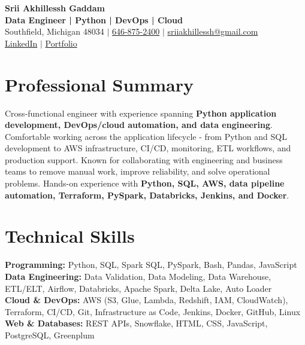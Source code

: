 \documentclass[letterpaper,10pt]{article}
\begin{document}
\fontsize{9.35pt}{10.45pt}\selectfont

\begin{center}
    {\LARGE \textbf{Srii Akhillessh Gaddam}} \\[-1pt]
    \textbf{Data Engineer | Python | DevOps | Cloud} \\[2pt]
    Southfield, Michigan 48034 $|$
    \href{tel:6468752400}{646-875-2400} $|$
    \href{mailto:sriiakhillessh@gmail.com}{sriiakhillessh@gmail.com} \\[1pt]
    \href{https://www.linkedin.com/in/srii-akhiilessh-gaddam-b48668191/}{LinkedIn} $|$
    \href{https://sriiakhillesshg.github.io/portfolio/}{Portfolio}
\end{center}
\vspace{-8pt}

\section{Professional Summary}
\small{Cross-functional engineer with experience spanning \textbf{Python application development, DevOps/cloud automation, and data engineering}. Comfortable working across the application lifecycle - from Python and SQL development to AWS infrastructure, CI/CD, monitoring, ETL workflows, and production support. Known for collaborating with engineering and business teams to remove manual work, improve reliability, and solve operational problems. Hands-on experience with \textbf{Python, SQL, AWS, data pipeline automation, Terraform, PySpark, Databricks, Jenkins, and Docker}.}

\section{Technical Skills}
\small{
\textbf{Programming:} Python, SQL, Spark SQL, PySpark, Bash, Pandas, JavaScript \\
\textbf{Data Engineering:} Data Validation, Data Modeling, Data Warehouse, ETL/ELT, Airflow, Databricks, Apache Spark, Delta Lake, Auto Loader \\
\textbf{Cloud \& DevOps:} AWS (S3, Glue, Lambda, Redshift, IAM, CloudWatch), Terraform, CI/CD, Git, Infrastructure as Code, Jenkins, Docker, GitHub, Linux \\
\textbf{Web \& Databases:} REST APIs, Snowflake, HTML, CSS, JavaScript, PostgreSQL, Greenplum
}
\end{document}
